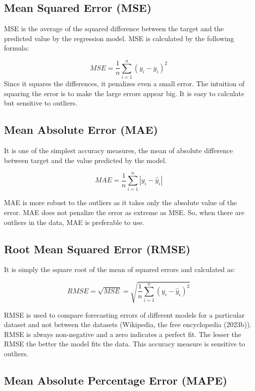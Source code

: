 \documentclass[mstat,12pt]{unswthesis}
\begin{document}
\hypertarget{mean-squared-error-mse}{%
\subsection{Mean Squared Error (MSE)}\label{mean-squared-error-mse}}

MSE is the average of the squared difference between the target and the
predicted value by the regression model. MSE is calculated by the
following formula:

\[
MSE = \frac{1}{n} \sum_{i=1}^{n} (y_{i} - \hat{y}_{i})^2
\] Since it squares the differences, it penalizes even a small error.
The intuition of squaring the error is to make the large errors appear
big. It is easy to calculate but sensitive to outliers.

\hypertarget{mean-absolute-error-mae}{%
\subsection{Mean Absolute Error (MAE)}\label{mean-absolute-error-mae}}

It is one of the simplest accuracy measures, the mean of absolute
difference between target and the value predicted by the model.

\[
MAE = \frac{1}{n} \sum_{i=1}^{n} |y_{i} - \hat{y}_{i}|  
\]

MAE is more robust to the outliers as it takes only the absolute value
of the error. MAE does not penalize the error as extreme as MSE. So,
when there are outliers in the data, MAE is preferable to use.

\hypertarget{root-mean-squared-error-rmse}{%
\subsection{Root Mean Squared Error
(RMSE)}\label{root-mean-squared-error-rmse}}

It is simply the square root of the mean of squared errors and
calculated as:

\[
RMSE = \sqrt{ MSE } = \sqrt {\frac{1}{n} \sum_{i=1}^{n} (y_{i} - \hat{y}_{i})^2}    
\]

RMSE is used to compare forecasting errors of different models for a
particular dataset and not between the datasets (Wikipedia, the free
encyclopedia (2023b)). RMSE is always non-negative and a zero indicates
a perfect fit. The lesser the RMSE the better the model fits the data.
This accuracy measure is sensitive to outliers.

\hypertarget{mean-absolute-percentage-error-mape}{%
\subsection{Mean Absolute Percentage Error
(MAPE)}\label{mean-absolute-percentage-error-mape}}
\end{document}
